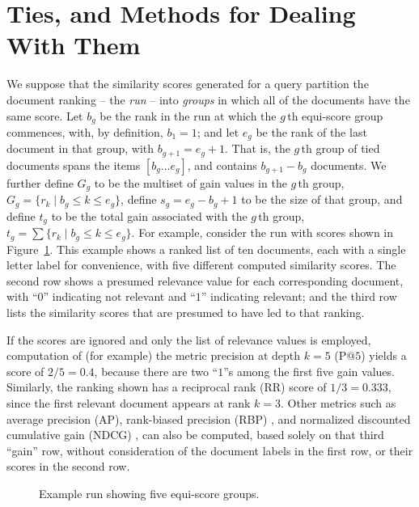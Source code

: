 \section{Ties, and Methods for Dealing With Them}
\label{sec-ties}


We suppose that the similarity scores generated for a query partition
the document ranking -- the {\emph{run}} -- into {\emph{groups}} in
which all of the documents have the same score.
Let $b_g$ be the rank in the run at which the $g$\,th equi-score
group commences, with, by definition, $b_1=1$; and let $e_g$ be the
rank of the last document in that group, with $b_{g+1}=e_g+1$.
That is, the $g$\,th group of tied documents spans the items
$[b_g\ldots e_g]$, and contains $b_{g+1}-b_g$ documents.
We further define $G_g$ to be the
multiset of gain values in the $g$\,th group,
	$G_g =\{r_k\mid b_g \le k \le e_g\}$, 
define $s_g=e_g-b_g+1$ to be the size of that group, and define $t_g$
to be the total gain associated with the $g$\,th group,
	$t_g = \sum \{r_k\mid b_g \le k \le e_g\}$.
For example, consider the run with scores shown in
Figure~\ref{fig-example}.
This example shows a ranked list of ten documents, each with a single
letter label for convenience, with five different computed similarity
scores.
The second row shows a presumed relevance value for each
corresponding document, with ``$0$'' indicating not relevant and
``$1$'' indicating relevant; and the third row lists the similarity
scores that are presumed to have led to that ranking.

If the scores are ignored and only the list of relevance values is
employed, computation of (for example) the metric precision at depth
$k=5$ (P@$5$) yields a score of $2/5=0.4$, because there are two
``$1$''s among the first five gain values.
Similarly, the ranking shown has a reciprocal rank (RR) score of
$1/3=0.333$, since the first relevant document appears at rank $k=3$.
Other metrics such as average precision (AP), rank-biased precision
(RBP) {\citep{mz08acmtois}}, and normalized discounted cumulative
gain (NDCG) {\citep{jk02acmtois}}, can also be computed, based solely
on that third ``gain'' row, without consideration of the document
labels in the first row, or their scores in the second row.

\begin{figure}[t]
\centering

\caption{Example run showing five equi-score groups.
\label{fig-example}}
\end{figure}

